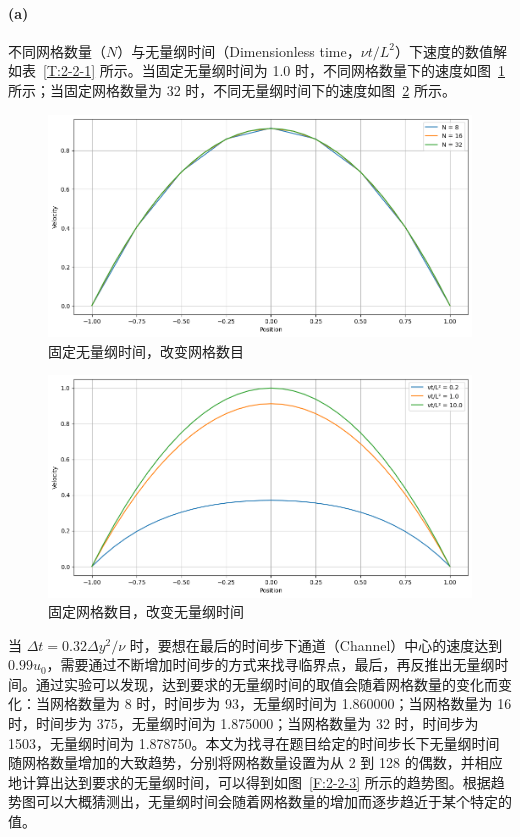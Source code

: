 \paragraph{(a)}
不同网格数量（$N$）与无量纲时间（Dimensionless time，$\nu t/L^2$）下速度的数值解如表~\ref{T:2-2-1} 所示。当固定无量纲时间为 1.0 时，不同网格数量下的速度如图~\ref{F:2-2-1} 所示；当固定网格数量为 32 时，不同无量纲时间下的速度如图~\ref{F:2-2-2} 所示。

\begin{figure}[H]
    \centering
    \includegraphics[width=.75\textwidth]{figure/2/grid.png}
    \caption{固定无量纲时间，改变网格数目}\label{F:2-2-1}
\end{figure}

\begin{figure}[H]
    \centering
    \includegraphics[width=.75\textwidth]{figure/2/velocity.png}
    \caption{固定网格数目，改变无量纲时间}\label{F:2-2-2}
\end{figure}

当 $\Delta t=0.32\Delta y^2/\nu$ 时，要想在最后的时间步下通道（Channel）中心的速度达到 $0.99u_0$，需要通过不断增加时间步的方式来找寻临界点，最后，再反推出无量纲时间。通过实验可以发现，达到要求的无量纲时间的取值会随着网格数量的变化而变化：当网格数量为 8 时，时间步为 93，无量纲时间为 \num{1.860000}；当网格数量为 16 时，时间步为 375，无量纲时间为 \num{1.875000}；当网格数量为 32 时，时间步为 1503，无量纲时间为 \num{1.878750}。本文为找寻在题目给定的时间步长下无量纲时间随网格数量增加的大致趋势，分别将网格数量设置为从 2 到 128 的偶数，并相应地计算出达到要求的无量纲时间，可以得到如图~\ref{F:2-2-3} 所示的趋势图。根据趋势图可以大概猜测出，无量纲时间会随着网格数量的增加而逐步趋近于某个特定的值。

